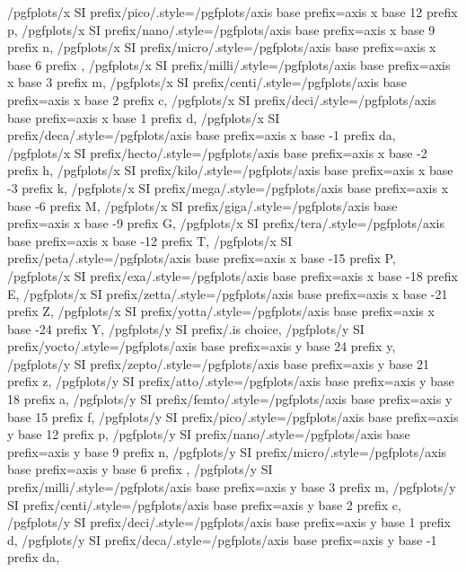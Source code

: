 {    /pgfplots/x SI prefix/pico/.style={/pgfplots/axis base prefix={axis x base 12 prefix p}},%
    /pgfplots/x SI prefix/nano/.style={/pgfplots/axis base prefix={axis x base 9 prefix n}},%
    /pgfplots/x SI prefix/micro/.style={/pgfplots/axis base prefix={axis x base 6 prefix \mu}},%
    /pgfplots/x SI prefix/milli/.style={/pgfplots/axis base prefix={axis x base 3 prefix m}},%
    /pgfplots/x SI prefix/centi/.style={/pgfplots/axis base prefix={axis x base 2 prefix c}},%
    /pgfplots/x SI prefix/deci/.style={/pgfplots/axis base prefix={axis x base 1 prefix d}},%
    /pgfplots/x SI prefix/deca/.style={/pgfplots/axis base prefix={axis x base -1 prefix da}},%
    /pgfplots/x SI prefix/hecto/.style={/pgfplots/axis base prefix={axis x base -2 prefix h}},%
    /pgfplots/x SI prefix/kilo/.style={/pgfplots/axis base prefix={axis x base -3 prefix k}},%
    /pgfplots/x SI prefix/mega/.style={/pgfplots/axis base prefix={axis x base -6 prefix M}},%
    /pgfplots/x SI prefix/giga/.style={/pgfplots/axis base prefix={axis x base -9 prefix G}},%
    /pgfplots/x SI prefix/tera/.style={/pgfplots/axis base prefix={axis x base -12 prefix T}},%
    /pgfplots/x SI prefix/peta/.style={/pgfplots/axis base prefix={axis x base -15 prefix P}},%
    /pgfplots/x SI prefix/exa/.style={/pgfplots/axis base prefix={axis x base -18 prefix E}},%
    /pgfplots/x SI prefix/zetta/.style={/pgfplots/axis base prefix={axis x base -21 prefix Z}},%
    /pgfplots/x SI prefix/yotta/.style={/pgfplots/axis base prefix={axis x base -24 prefix Y}},%
    /pgfplots/y SI prefix/.is choice,%
    /pgfplots/y SI prefix/yocto/.style={/pgfplots/axis base prefix={axis y base 24 prefix y}},%
    /pgfplots/y SI prefix/zepto/.style={/pgfplots/axis base prefix={axis y base 21 prefix z}},%
    /pgfplots/y SI prefix/atto/.style={/pgfplots/axis base prefix={axis y base 18 prefix a}},%
    /pgfplots/y SI prefix/femto/.style={/pgfplots/axis base prefix={axis y base 15 prefix f}},%
    /pgfplots/y SI prefix/pico/.style={/pgfplots/axis base prefix={axis y base 12 prefix p}},%
    /pgfplots/y SI prefix/nano/.style={/pgfplots/axis base prefix={axis y base 9 prefix n}},%
    /pgfplots/y SI prefix/micro/.style={/pgfplots/axis base prefix={axis y base 6 prefix \mu}},%
    /pgfplots/y SI prefix/milli/.style={/pgfplots/axis base prefix={axis y base 3 prefix m}},%
    /pgfplots/y SI prefix/centi/.style={/pgfplots/axis base prefix={axis y base 2 prefix c}},%
    /pgfplots/y SI prefix/deci/.style={/pgfplots/axis base prefix={axis y base 1 prefix d}},%
    /pgfplots/y SI prefix/deca/.style={/pgfplots/axis base prefix={axis y base -1 prefix da}},%
}
